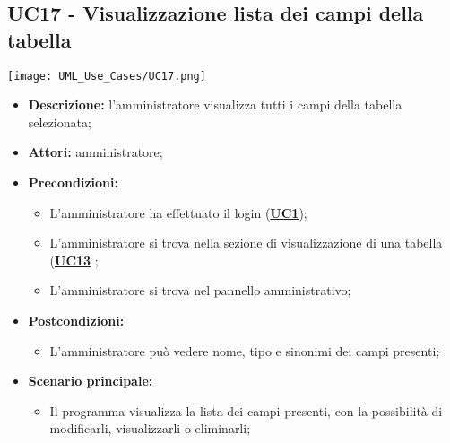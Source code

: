 \subsection{UC17 - Visualizzazione lista dei campi della tabella}
\label{sec:UC17}
\texttt{[image: UML\_Use\_Cases/UC17.png]}
\begin{itemize}
	\item \textbf{Descrizione:} l’amministratore visualizza tutti i campi della tabella selezionata;
	\item \textbf{Attori:} amministratore;
	\item \textbf{Precondizioni:} 
	\begin{itemize}
		\item L’amministratore ha effettuato il login (\hyperref[sec:UC1]{\textbf{UC1}});
		\item L’amministratore si trova nella sezione di visualizzazione di una tabella (\hyperref[sec:UC13]{\textbf{UC13}} ;
		\item L’amministratore si trova nel pannello amministrativo;
	\end{itemize}
	\item \textbf{Postcondizioni:} 
	\begin{itemize}
		\item L'amministratore può vedere nome, tipo e sinonimi dei campi presenti;
	\end{itemize}
	\item \textbf{Scenario principale:} 
	\begin{itemize}
		\item Il programma visualizza la lista dei campi presenti, con la possibilità di modificarli, visualizzarli o eliminarli;
	\end{itemize}
\end{itemize}

